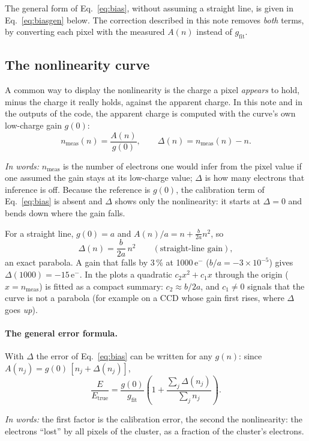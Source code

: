\documentclass[11pt,a4paper]{article}
\newcommand{\eminus}{e$^-$}
\newcommand{\gfit}{g_{\mathrm{fit}}}
\newcommand{\inwords}[1]{\par\noindent\textit{In words:} #1\par}
\begin{document}
The general form of Eq.~\ref{eq:bias}, without assuming a straight line, is given in
Eq.~\ref{eq:biasgen} below. The correction described in this note removes \emph{both} terms, by
converting each pixel with the measured $A(n)$ instead of $\gfit$.

\subsection{The nonlinearity curve}
\label{sec:delta}
A common way to display the nonlinearity is the charge a pixel \emph{appears} to hold, minus the
charge it really holds, against the apparent charge. In this note and in the outputs of the code,
the apparent charge is computed with the curve's own low-charge gain $g(0)$:
\begin{equation}
n_{\mathrm{meas}}(n) = \frac{A(n)}{g(0)}, \qquad
\Delta(n) = n_{\mathrm{meas}}(n) - n .
\label{eq:delta}
\end{equation}
\inwords{$n_{\mathrm{meas}}$ is the number of electrons one would infer from the pixel value if one
assumed the gain stays at its low-charge value; $\Delta$ is how many electrons that inference is off.
Because the reference is $g(0)$, the calibration term of Eq.~\ref{eq:bias} is absent and $\Delta$
shows only the nonlinearity: it starts at $\Delta=0$ and bends down where the gain falls.}

For a straight line, $g(0)=a$ and $A(n)/a = n + \frac{b}{2a}n^2$, so
\begin{equation}
\Delta(n) = \frac{b}{2a}\,n^2 \qquad (\text{straight-line gain}),
\label{eq:parab}
\end{equation}
an exact parabola. A gain that falls by 3\,\% at 1000\,\eminus{} ($b/a = -3\times10^{-5}$) gives
$\Delta(1000) = -15$\,\eminus. In the plots a quadratic $c_2 x^2 + c_1 x$ through the origin
($x = n_{\mathrm{meas}}$) is fitted as a compact summary: $c_2 \approx b/2a$, and $c_1 \neq 0$ signals
that the curve is not a parabola (for example on a CCD whose gain first rises, where $\Delta$ goes
\emph{up}).

\paragraph{The general error formula.} With $\Delta$ the error of Eq.~\ref{eq:bias} can be written for
any $g(n)$: since $A(n_j) = g(0)\,[n_j + \Delta(n_j)]$,
\begin{equation}
\frac{E}{E_{\mathrm{true}}} = \frac{g(0)}{\gfit}\left(1 + \frac{\sum_j \Delta(n_j)}{\sum_j n_j}\right).
\label{eq:biasgen}
\end{equation}
\inwords{the first factor is the calibration error, the second the nonlinearity: the electrons
``lost'' by all pixels of the cluster, as a fraction of the cluster's electrons.}
\end{document}
